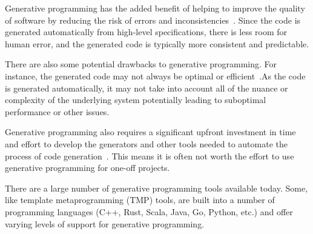 Generative programming has the added benefit of helping to improve the quality 
of software by reducing the risk of errors and 
inconsistencies~\cite{Czarnecki2000,Taha2006}. Since the code is generated 
automatically from high-level specifications, there is less room for human 
error, and the generated code is typically more consistent and predictable.

There are also some potential drawbacks to generative programming. For 
instance, the generated code may not always be optimal or 
efficient~\cite{Czarnecki2000,Taha2006}.As the code is generated 
automatically, it may not take into account all of the nuance or complexity
of the underlying system potentially leading to suboptimal performance or other 
issues.

Generative programming also requires a significant upfront investment in time 
and effort to develop the generators and other tools needed to automate the 
process of code generation~\cite{Czarnecki2000,Taha2006}. This means it is 
often not worth the effort to use generative programming for one-off projects.

There are a large number of generative programming tools available today. Some, 
like template metaprogramming (TMP) tools, are built into a number of 
programming languages (C++, Rust, Scala, Java, Go, Python, etc.) and offer 
varying levels of support for generative programming. 
